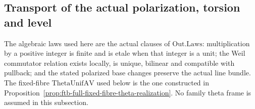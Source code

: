 \subsection{Transport of the actual polarization, torsion and level}
\label{subsec:ftb-relative-polarization-level}

The algebraic laws used here are the actual clauses of
\(\mathrm{Out.Laws}\): multiplication by a positive integer
is finite and is etale when that integer is a unit;
the Weil commutator relation exists locally, is unique,
bilinear and compatible with pullback; and the stated
polarized base changes preserve the actual line bundle.
The fixed-fibre \(\mathrm{ThetaUnifAV}\) used below is
the one constructed in
Proposition~\ref{prop:ftb-full-fixed-fibre-theta-realization}.
No family theta frame is assumed in this subsection.

